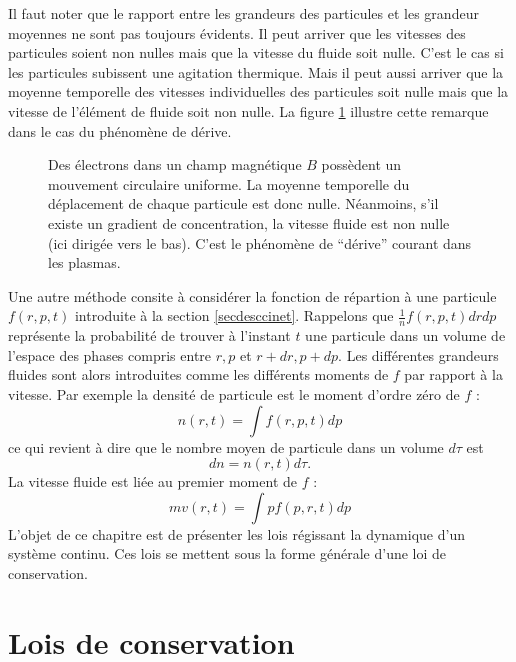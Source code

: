 \documentclass[12pt]{book}
\begin{document}
\begin{rem}
Il faut noter que le rapport entre les grandeurs des particules et les
grandeur moyennes ne sont pas toujours \'evidents. Il peut arriver que
les vitesses des particules soient non nulles mais que  la vitesse du fluide
soit nulle. C'est le cas si les particules subissent une agitation
thermique. Mais il peut aussi arriver que  la moyenne temporelle des 
vitesses individuelles des particules  soit nulle mais que la vitesse
de l'\'el\'ement de fluide soit non nulle. La figure \ref{figvitnonul}
illustre cette remarque dans le cas du ph\'enom\`ene de
d\'erive\cite{ph:plasm:Chen84}. 
\begin{figure}[htb]
 \centerline{}   
 \caption{Des \'electrons dans un champ magn\'etique $B$ poss\`edent un
mouvement circulaire uniforme. La moyenne temporelle du d\'eplacement de
chaque particule est donc nulle. N\'eanmoins, s'il existe un gradient de
concentration, la vitesse fluide est non nulle (ici dirig\'ee vers le
bas). C'est le ph\'enom\`ene de ``d\'erive'' courant dans les plasmas. }
 \label{figvitnonul}
\end{figure}
\end{rem}

Une autre m\'ethode consite \`a consid\'erer la fonction de
r\'epartion \`a une particule $f(r,p,t)$ introduite \`a la section
\ref{secdesccinet}. Rappelons que $\frac{1}{n}f(r,p,t)drdp$
repr\'esente la probabilit\'e de trouver \`a l'instant $t$ une
particule dans un volume de l'espace des phases compris entre $r,p$ et
$r+dr,p+dp$. 
Les diff\'erentes grandeurs fluides sont alors introduites comme les
diff\'erents moments de $f$ par rapport \`a la vitesse. Par exemple la
densit\'e de particule est le moment d'ordre z\'ero de $f$ :
\begin{equation}
n(r,t)=\int f(r,p,t)dp
\end{equation}
ce qui revient \`a dire que le nombre moyen de particule dans un
volume $d\tau$ est 
\begin{equation}
dn=n(r,t)d\tau.
\end{equation}
La vitesse fluide est li\'ee au premier moment de $f$ :
\begin{equation}
mv(r,t)=\int pf(p,r,t)dp
\end{equation}
L'objet de ce chapitre est de pr\'esenter les lois r\'egissant la
dynamique d'un syst\`eme continu. Ces lois se mettent sous la forme
g\'en\'erale d'une loi de conservation.
\section{Lois de conservation}
\end{document}
